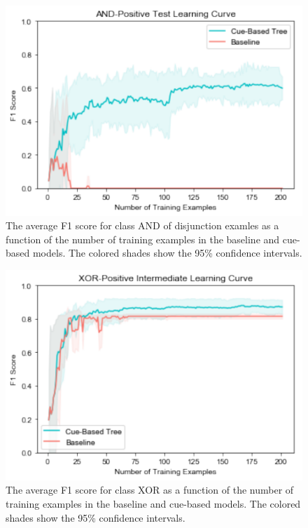 \documentclass[,man,floatsintext]{apa6}
\begin{document}
\begin{figure}
\centering
\includegraphics{figs/ANDintermediateDis-1.pdf}
\caption{\label{fig:ANDintermediateDis}The average F1 score for class AND of disjunction examles as a function of the number of training examples in the baseline and cue-based models. The colored shades show the 95\% confidence intervals.}
\end{figure}

\begin{figure}
\centering
\includegraphics{figs/XORintermediate-1.pdf}
\caption{\label{fig:XORintermediate}The average F1 score for class XOR as a function of the number of training examples in the baseline and cue-based models. The colored shades show the 95\% confidence intervals.}
\end{figure}
\end{document}
